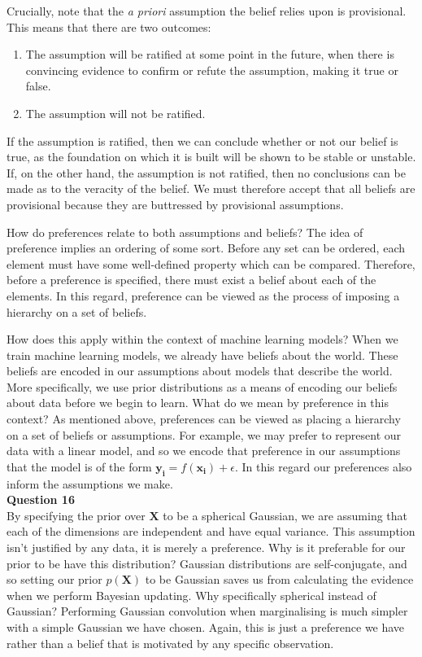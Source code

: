 \documentclass[10pt, a4paper, twocolumn]{article} %
\begin{document}
\begin{enumerate}
  Crucially, note that the \textit{a priori} assumption the belief relies upon is provisional. This means that there are two outcomes:
  \begin{enumerate}
      \item The assumption will be ratified at some point in the future, when there is convincing evidence to confirm or refute the assumption, making it true or false.
      \item The assumption will not be ratified.
  \end{enumerate}
  If the assumption is ratified, then we can conclude whether or not our belief is true, as the foundation on which it is built will be shown to be stable or unstable. If, on the other hand, the assumption is not ratified, then no conclusions can be made as to the veracity of the belief. We must therefore accept that all beliefs are provisional because they are buttressed by provisional assumptions.
  
  How do preferences relate to both assumptions and beliefs? The idea of preference implies an ordering of some sort. Before any set can be ordered, each element must have some well-defined property which can be compared. Therefore, before a preference is specified, there must exist a belief about each of the elements. In this regard, preference can be viewed as the process of imposing a hierarchy on a set of beliefs.
  
  How does this apply within the context of machine learning models?  When we train machine learning models, we already have beliefs about the world. These beliefs are encoded in our assumptions about models that describe the world. More specifically, we use prior distributions as a means of encoding our beliefs about data before we begin to learn. What do we mean by preference in this context? As mentioned above, preferences can be viewed as placing a hierarchy on a set of beliefs or assumptions. For example, we may prefer to represent our data with a linear model, and so we encode that preference in our assumptions that the model is of the form $\mathbf{y_i} = f(\mathbf{x_i}) + \epsilon$. In this regard our preferences also inform the assumptions we make.\\
  
  \textbf{Question 16}\\
  By specifying the prior over $\mathbf{X}$ to be a spherical Gaussian, we are assuming that each of the dimensions are independent and have equal variance. This assumption isn't justified by any data, it is merely a preference. Why is it preferable for our prior to be have this distribution? Gaussian distributions are self-conjugate, and so setting our prior $p(\mathbf{X})$ to be Gaussian saves us from calculating the evidence when we perform Bayesian updating. Why specifically spherical instead of Gaussian? Performing Gaussian convolution when marginalising is much simpler with a simple Gaussian we have chosen. Again, this is just a preference we have rather than a belief that is motivated by any specific observation.
  

\end{enumerate}
\end{document}
